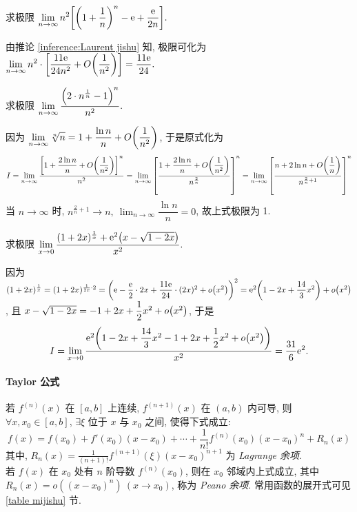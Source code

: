 \begin{example}
    求极限 $\displaystyle\lim_{n\to\infty}n^2\qty[\qty(1+\dfrac{1}{n})^n-\mathrm{e}+\dfrac{\mathrm{e}}{2n}].$
\end{example}
\begin{solution}
    由推论 \ref{inference:Laurent jishu} 知, 极限可化为 $\displaystyle\lim_{n\to\infty}n^2\cdot\qty[\dfrac{11\mathrm{e}}{24n^2}+O\qty(\dfrac{1}{n^2})]=\dfrac{11\mathrm{e}}{24}.$
\end{solution}

\begin{example}
    求极限 $\displaystyle\lim_{n\to\infty}\dfrac{\qty(2\cdot n^{\frac{1}{n}}-1)^n}{n^2}.$
\end{example}
\begin{solution}
    因为 $\displaystyle \lim_{n\to\infty}\sqrt[n]{n}=1+\dfrac{\ln n}{n}+O\qty(\dfrac{1}{n^2})$, 于是原式化为
    $$I=\lim_{n\to\infty}\dfrac{\qty[1+\dfrac{2\ln n}{n}+O\qty(\dfrac{1}{n^2})]^n}{n^2}=\lim_{n\to\infty}\qty[\dfrac{1+\dfrac{2\ln n}{n}+O\qty(\dfrac{1}{n^2})}{n^{\frac{2}{n}}}]^n=\lim_{n\to\infty}\qty[\dfrac{n+2\ln n+O\qty(\dfrac{1}{n})}{n^{\frac{2}{n}+1}}]^n$$
    当 $n\to\infty$ 时, $n^{\frac{2}{n}+1}\to n,~\displaystyle\lim_{n\to\infty}\dfrac{\ln n}{n}=0$, 故上式极限为 1.
\end{solution}

\begin{example}
    求极限 $\displaystyle \lim_{x\to0}\dfrac{(1+2x)^{\frac{1}{x}}+\mathrm{e}^{2}\qty(x-\sqrt{1-2x})}{x^2}.$
\end{example}
\begin{solution}
    因为 $(1+2x)^{\frac{1}{x}}=(1+2x)^{\frac{1}{2x}\cdot 2}=\qty(\mathrm{e}-\dfrac{\mathrm{e}}{2}\cdot2x+\dfrac{11\mathrm{e}}{24}\cdot(2x)^2+o\qty(x^2))^2=\mathrm{e}^2\qty(1-2x+\dfrac{14}{3}x^2)+o\qty(x^2)$, 且 $x-\sqrt{1-2x}=-1+2x+\dfrac{1}{2}x^2+o\qty(x^2)$, 于是
    $$I=\lim_{x\to0}\dfrac{\mathrm{e}^2\qty(1-2x+\dfrac{14}{3}x^2-1+2x+\dfrac{1}{2}x^2+o\qty(x^2))}{x^2}=\dfrac{31}{6}\mathrm{e}^2.$$
\end{solution}

\paragraph{Taylor 公式}
若 $f^{(n)}(x)$ 在 $[a,b]$ 上连续, $f^{(n+1)}(x)$ 在 $(a,b)$ 内可导, 则 $\forall x,x_0\in[a,b]$, $\exists \xi$ 位于 $x$ 与 $x_0$ 之间, 使得下式成立:
$$f(x)=f(x_0)+f'(x_0)(x-x_0)+\cdots+\frac{1}{n!}f^{(n)}(x_0)(x-x_0)^n+R_n(x)$$
其中, $\displaystyle R_n(x)=\frac{1}{(n+1)!}f^{(n+1)}(\xi)(x-x_0)^{n+1}$ 为 \textit{Lagrange 余项}.\\
若 $f(x)$ 在 $x_0$ 处有 $n$ 阶导数 $f^{(n)}(x_0)$, 则在 $x_0$ 邻域内上式成立,
其中 $R_n(x)=o((x-x_0)^n)~ (x\to x_0)$, 称为 \textit{Peano 余项}. 常用函数的展开式可见 \ref{table mijishu} 节.

